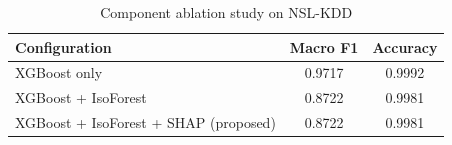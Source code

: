 \begin{table}[h]
\centering
\caption{Component ablation study on NSL-KDD}
\label{tab:ablation}
\begin{tabular}{lcc}
\hline
\textbf{Configuration} & \textbf{Macro F1} & \textbf{Accuracy} \\
\hline
XGBoost only & 0.9717 & 0.9992 \\
XGBoost + IsoForest & 0.8722 & 0.9981 \\
XGBoost + IsoForest + SHAP (proposed) & 0.8722 & 0.9981 \\
\hline
\end{tabular}
\end{table}